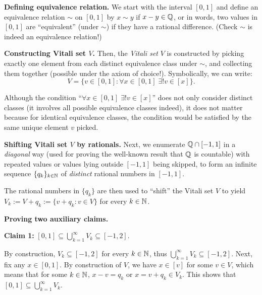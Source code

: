 \begin{enumerate}
\begin{pf}
\textbf{Defining equivalence relation.} We start with the interval \([0,1]\)
and define an equivalence relation \(\sim\) on \([0,1]\) by \(x\sim y\) if
\(x-y\in \mathbb{Q}\), or in words, two values in \([0,1]\) are ``equivalent'' (under
\(\sim\)) if they have a rational difference. (Check \(\sim\) is indeed an
equivalence relation!)

\textbf{Constructing Vitali set \(V\).} Then, the \emph{Vitali set} \(V\) is
constructed by picking exactly one element from each distinct equivalence class
under \(\sim\), and collecting them together (possible under the axiom of
choice!).  Symbolically, we can write:
\[
V=\{v\in[0,1]:\forall x\in [0,1]\; \exists! v\in [x]\}.
\]
\begin{note}
Although the condition ``\(\forall x\in [0,1]\; \exists! v\in [x]\)'' does not
only consider distinct classes (it involves all possible equivalence classes
indeed), it does not matter because for identical equivalence classes, the
condition would be satisfied by the same unique element \(v\) picked.
\end{note}
\begin{center}
\end{center}

\textbf{Shifting Vitali set \(V\) by rationals.}
Next, we enumerate \(\mathbb{Q}\cap[-1,1]\) in a \emph{diagonal} way (used for proving
the well-known result that \(\mathbb{Q}\) is countable) with repeated values or values
lying outside \([-1,1]\) being skipped, to form an infinite sequence
\(\{q_k\}_{k\in\mathbb{N}}\) of \emph{distinct} rational numbers in \([-1,1]\).

The rational numbers in \(\{q_k\}\) are then used to ``shift'' the Vitali set
\(V\) to yield \(V_k:=V+q_k:=\{v+q_k:v\in V\}\) for every \(k\in\mathbb{N}\).

\textbf{Proving two auxiliary claims.}

\textbf{Claim 1:} \([0,1]\subseteq \bigcup_{k=1}^{\infty}V_k\subseteq [-1,2]\).

\begin{pf}
By construction, \(V_k\subseteq [-1,2]\) for every \(k\in\mathbb{N}\), thus
\(\bigcup_{k=1}^{\infty}V_k\subseteq [-1,2]\). Next, fix any \(x\in [0,1]\). By
construction of \(V\), we have \(x\in [v]\) for some \(v\in V\), which means
that for some \(k\in\mathbb{N}\), \(x-v=q_k\) or \(x=v+q_k\in V_k\). This shows that
\([0,1]\subseteq \bigcup_{k=1}^{\infty}V_k\).
\end{pf}


\end{pf}
\end{enumerate}
